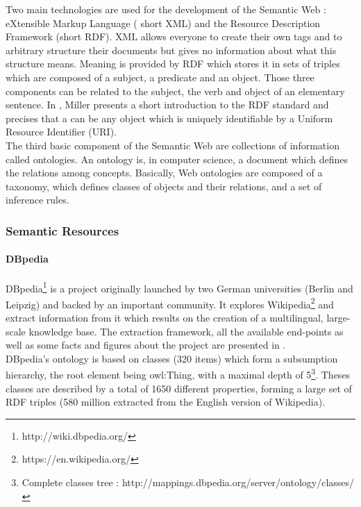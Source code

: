 Two main technologies are used for the development of the Semantic Web : eXtensible Markup Language ( short XML) and the Resource Description Framework (short RDF). XML allows everyone to create their own tags and to arbitrary structure their documents but gives no information about what this structure means. Meaning is provided by RDF which stores it in sets of triples which are composed of a subject, a predicate and an object. Those three components can be related to the subject, the verb and object of an elementary sentence. In \cite{miller}, Miller presents a short introduction to the RDF standard and precises that a  can be any object which is uniquely identifiable by a Uniform Resource Identifier (URI).\\

The third basic component of the Semantic Web are collections of information called ontologies. An ontology is, in computer science, a document which defines the relations among concepts. Basically, Web ontologies are composed of a taxonomy, which defines classes of objects and their relations, and a set of inference rules.\\

\subsubsection{Semantic Resources} %
\label{ssub:semantic_resources}
\paragraph{DBpedia} %
\label{par:dbpedia}
DBpedia\footnote{http://wiki.dbpedia.org/} is a project originally launched by two German universities (Berlin and Leipzig) and backed by an important community. It explores Wikipedia\footnote{https://en.wikipedia.org/} and extract information from it which results on the creation of a multilingual, large-scale knowledge base. The extraction framework, all the available end-points as well as some facts and figures about the project are presented in \cite{lehman}.\\

DBpedia's ontology is based on classes (320 items) which form a subsumption hierarchy, the root element being owl:Thing, with a maximal depth of 5\footnote{Complete classes tree : http://mappings.dbpedia.org/server/ontology/classes/}. Theses classes are described by a total of 1650 different properties, forming a large set of RDF triples (580 million extracted from the English version of Wikipedia).\\

